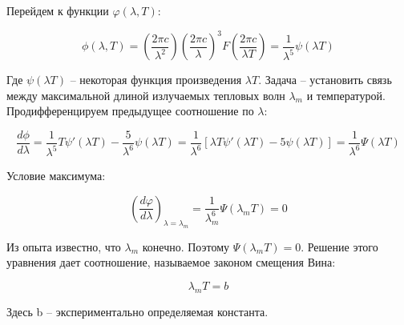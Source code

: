 \documentclass{article}
\begin{document}
	Перейдем к функции $\varphi(\lambda,T)$:

	\begin{equation}
		\phi(\lambda,T) = (\frac{2\pi c}{\lambda^2})(\frac{2\pi c}{\lambda})^3 F(\frac{2\pi c}{\lambda T}) = \frac{1}{\lambda^5} \psi(\lambda T)
	\end{equation}

	Где $\psi (\lambda T)$ -- некоторая функция произведения $\lambda T$. Задача -- установить связь между максимальной длиной излучаемых тепловых волн $\lambda_m$ и температурой. Продифференцируем предыдущее соотношение по $\lambda$:

	\begin{equation}
		\frac{d\phi}{d\lambda} = \frac{1}{\lambda^5}T\psi'(\lambda T) - \frac{5}{\lambda^6} \psi(\lambda T) = \frac{1}{\lambda^6}[\lambda T \psi'(\lambda T) - 5\psi(\lambda T)] = \frac{1}{\lambda^6}\Psi(\lambda T)
	\end{equation}

	Условие максимума:

	\begin{equation}
		(\frac{d\varphi}{d\lambda})_{\lambda = \lambda_m} = \frac{1}{\lambda_m^6}\Psi(\lambda_m T) = 0
	\end{equation}

	Из опыта известно, что $\lambda_m$ конечно. Поэтому $\Psi(\lambda_m T) = 0$. Решение этого уравнения дает соотношение, называемое законом смещения Вина:

	\begin{equation}
		\lambda_m T = b
	\end{equation}

	Здесь b -- экспериментально определяемая константа.
\end{document}

